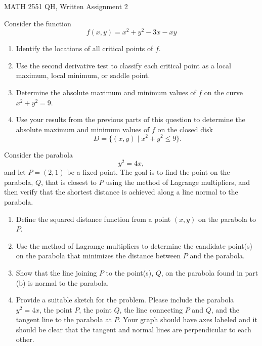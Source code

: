 \documentclass[12pt]{exam}
\begin{document}
\begin{center}
    \Large{MATH 2551 QH, Written Assignment 2}
\end{center}

\begin{questions}

    \question[5] Consider the function
\[
f(x,y)= x^2+y^2-3x-xy
\]

\begin{enumerate}[label=(\alph*)]
    \item  Identify the locations of all critical points of \( f \).
    
    \item  Use the second derivative test to classify each critical point as a local maximum, local minimum, or saddle point.

    \item Determine the absolute maximum and minimum values of $f$ on the curve $x^2+y^2=9$. 
    
    \item  Use your results from the previous parts of this question to determine the absolute maximum and minimum values of \( f \) on the closed disk 
    \[
    D=\{(x,y) \mid x^2+y^2\le9\}.
    \]
\end{enumerate}

\bigskip

    \question[5] Consider the parabola
\[
y^2 = 4x,
\]
and let \(P = (2,1)\) be a fixed point. The goal is to find the point on the parabola, $Q$, that is closest to \(P\) using the method of Lagrange multipliers, and then verify that the shortest distance is achieved along a line normal to the parabola.

\bigskip

\begin{enumerate}[label=(\alph*)]
    \item  
    Define the squared distance function from a point \((x,y)\) on the parabola to \(P\).

    \item  Use the method of Lagrange multipliers to determine the candidate point(s) on the parabola that minimizes the distance between \(P\) and the parabola. 

    \item
    Show that the line joining \(P\) to the point(s), $Q$, on the parabola found in part (b) is normal to the parabola. 

    \item Provide a suitable sketch for the problem. Please include the parabola \(y^2 = 4x\), the point $P$, the point $Q$, the line connecting $P$ and $Q$, and the tangent line to the parabola at $P$. Your graph should have axes labeled and it should be clear that the tangent and normal lines are perpendicular to each other. 

\end{enumerate}

\end{questions}
\end{document}
